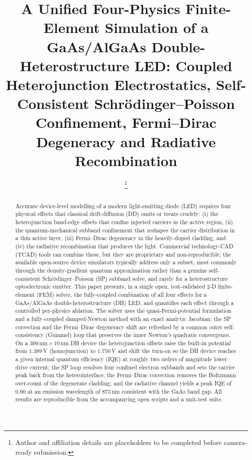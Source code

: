 \documentclass[conference]{IEEEtran}
\begin{document}
\title{A Unified Four-Physics Finite-Element Simulation of a GaAs/AlGaAs
Double-Heterostructure LED: Coupled Heterojunction Electrostatics,
Self-Consistent Schr\"odinger--Poisson Confinement, Fermi--Dirac Degeneracy
and Radiative Recombination}

\author{
\thanks{Author and affiliation details are placeholders to be completed before
camera-ready submission.}}

\maketitle

\begin{abstract}
Accurate device-level modelling of a modern light-emitting diode (LED) requires
four physical effects that classical drift-diffusion (DD) omits or treats
crudely: (i) the heterojunction band-edge offsets that confine injected carriers
in the active region, (ii) the quantum-mechanical subband confinement that
reshapes the carrier distribution in a thin active layer, (iii) Fermi--Dirac
degeneracy in the heavily-doped cladding, and (iv) the radiative recombination
that produces the light. Commercial technology-CAD (TCAD) tools can combine
these, but they are proprietary and non-reproducible; the available open-source
device simulators typically address only a subset, most commonly through the
density-gradient quantum approximation rather than a genuine self-consistent
Schr\"odinger--Poisson (SP) subband solve, and rarely for a heterostructure
optoelectronic emitter. This paper presents, in a single open, test-validated
2-D finite-element (FEM) solver, the fully-coupled combination of all four
effects for a GaAs/AlGaAs double-heterostructure (DH) LED, and quantifies each
effect through a controlled per-physics ablation. The solver uses the
quasi-Fermi-potential formulation and a fully-coupled damped-Newton method with
an exact analytic Jacobian; the SP correction and the Fermi--Dirac degeneracy
shift are refreshed by a common outer self-consistency (Gummel) loop that
preserves the inner Newton's quadratic convergence. On a
$300\,\text{nm}\times10\,\text{nm}$ DH device the heterojunction offsets raise
the built-in potential from $1.389\,$V (homojunction) to $1.750\,$V and shift the
turn-on so the DH device reaches a given internal quantum efficiency (IQE) at
roughly two orders of magnitude lower drive current; the SP loop resolves four
confined electron subbands and sets the carrier peak back from the
heterointerface; the Fermi--Dirac correction removes the Boltzmann over-count of
the degenerate cladding; and the radiative channel yields a peak IQE of $0.90$ at
an emission wavelength of $873\,$nm consistent with the GaAs band gap. All
results are reproducible from the accompanying open scripts and a unit-test suite.
\end{abstract}
\end{document}
